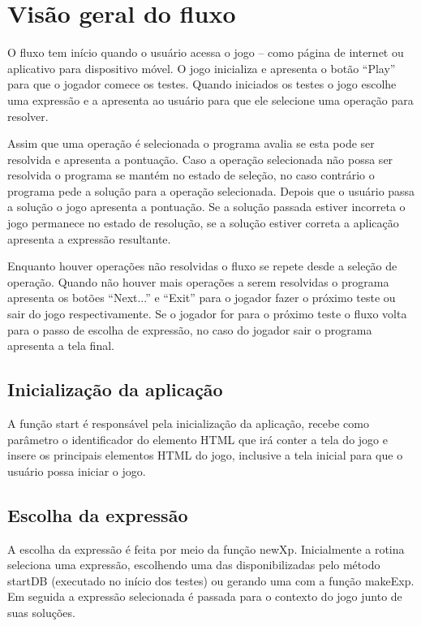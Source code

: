 \chapter{Visão geral do fluxo}
O fluxo tem início quando o usuário acessa o jogo – como página de internet ou aplicativo para dispositivo móvel. O jogo inicializa e apresenta o botão “Play” para que o jogador comece os testes. Quando iniciados os testes o jogo escolhe uma expressão e a apresenta ao usuário para que ele selecione uma operação para resolver.

Assim que uma operação é selecionada o programa avalia se esta pode ser resolvida e apresenta a pontuação. Caso a operação selecionada não possa ser resolvida o programa se mantém no estado de seleção, no caso contrário o programa pede a solução para a operação selecionada. Depois que o usuário passa a solução o jogo apresenta a pontuação. Se a solução passada estiver incorreta o jogo permanece no estado de resolução, se a solução estiver correta a aplicação apresenta a expressão resultante.

Enquanto houver operações não resolvidas o fluxo se repete desde a seleção de operação. Quando não houver mais operações a serem resolvidas o programa apresenta os botões “Next...” e “Exit” para o jogador fazer o próximo teste ou sair do jogo respectivamente. Se o jogador for para o próximo teste o fluxo volta para o passo de escolha de expressão, no caso do jogador sair o programa apresenta a tela final.

\section{Inicialização da aplicação}
A função start é responsável pela inicialização da aplicação, recebe como parâmetro o identificador do elemento HTML que irá conter a tela do jogo e insere os principais elementos HTML do jogo, inclusive a tela inicial para que o usuário possa iniciar o jogo.

\section{Escolha da expressão}
A escolha da expressão é feita por meio da função newXp. Inicialmente a rotina seleciona uma expressão, escolhendo uma das disponibilizadas pelo método startDB (executado no início dos testes) ou gerando uma com a função makeExp. Em seguida a expressão selecionada é passada para o contexto do jogo junto de suas soluções.


